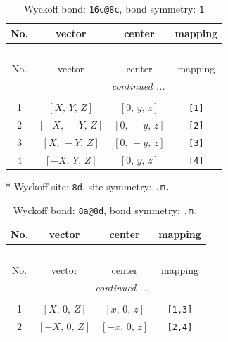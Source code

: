 \documentclass[fleqn,8pt]{jsarticle}
\begin{document}
\begin{longtable}{cccc}
\caption{Wyckoff bond: {\tt 16c@8c}, bond symmetry: {\tt 1}}
 \\
 \hline \hline
No. & vector & center & mapping \\ \hline \endfirsthead

\multicolumn{3}{l}{\tablename\ \thetable{}} \\
 \hline \hline
No. & vector & center & mapping \\ \hline \endhead

 \hline \hline
\multicolumn{3}{r}{\footnotesize\it continued ...} \\ \endfoot

 \hline \hline
\multicolumn{3}{r}{} \\ \endlastfoot

1 & $\left[ X,\, Y,\, Z \right]$ & $\left[ 0,\, y,\, z \right]$ & {\tt [1]} \\ \hline
2 & $\left[ - X,\, - Y,\, Z \right]$ & $\left[ 0,\, - y,\, z \right]$ & {\tt [2]} \\ \hline
3 & $\left[ X,\, - Y,\, Z \right]$ & $\left[ 0,\, - y,\, z \right]$ & {\tt [3]} \\ \hline
4 & $\left[ - X,\, Y,\, Z \right]$ & $\left[ 0,\, y,\, z \right]$ & {\tt [4]} \\
\end{longtable}
* Wyckoff site: {\tt 8d}, site symmetry: {\tt .m.}
\renewcommand{\arraystretch}{1.2}
\begin{longtable}{cccc}
\caption{Wyckoff bond: {\tt 8a@8d}, bond symmetry: {\tt .m.}}
 \\
 \hline \hline
No. & vector & center & mapping \\ \hline \endfirsthead

\multicolumn{3}{l}{\tablename\ \thetable{}} \\
 \hline \hline
No. & vector & center & mapping \\ \hline \endhead

 \hline \hline
\multicolumn{3}{r}{\footnotesize\it continued ...} \\ \endfoot

 \hline \hline
\multicolumn{3}{r}{} \\ \endlastfoot

1 & $\left[ X,\, 0,\, Z \right]$ & $\left[ x,\, 0,\, z \right]$ & {\tt [1,3]} \\ \hline
2 & $\left[ - X,\, 0,\, Z \right]$ & $\left[ - x,\, 0,\, z \right]$ & {\tt [2,4]} \\
\end{longtable}
\end{document}
